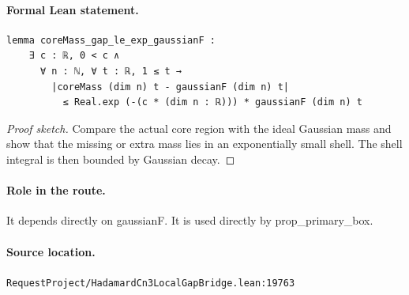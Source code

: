 \medskip
\paragraph{Formal Lean statement.}
\begin{verbatim}
lemma coreMass_gap_le_exp_gaussianF :
    ∃ c : ℝ, 0 < c ∧
      ∀ n : ℕ, ∀ t : ℝ, 1 ≤ t →
        |coreMass (dim n) t - gaussianF (dim n) t|
          ≤ Real.exp (-(c * (dim n : ℝ))) * gaussianF (dim n) t
\end{verbatim}
\begin{proof}[Proof sketch]
Compare the actual core region with the ideal Gaussian mass and show that the missing or extra mass lies in an exponentially small shell. The shell integral is then bounded by Gaussian decay.
\end{proof}
\paragraph{Role in the route.}
It depends directly on gaussianF. It is used directly by prop\_primary\_box.
\paragraph{Source location.}
\texttt{RequestProject/HadamardCn3LocalGapBridge.lean:19763}
\medskip
